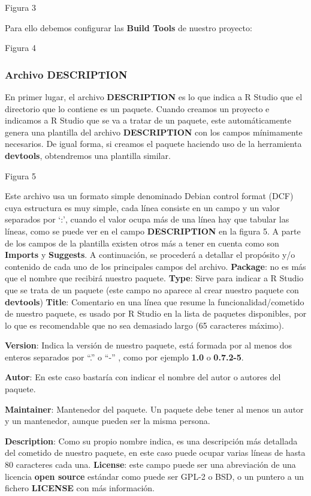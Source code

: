 Figura 3

Para ello debemos configurar las \textbf{Build Tools} de nuestro proyecto:

Figura 4

\subsubsection{Archivo DESCRIPTION}

En primer lugar, el archivo \textbf{DESCRIPTION} es lo que indica a R Studio que el directorio que lo
contiene es un paquete. Cuando creamos un proyecto e indicamos a R Studio que se va a
tratar de un paquete, este autom\'aticamente genera una plantilla del archivo \textbf{DESCRIPTION}
con los campos m\'inimamente necesarios. De igual forma, si creamos el paquete haciendo uso de la herramienta \textbf{devtools}, obtendremos
una plantilla similar.

Figura 5

Este archivo usa un formato simple denominado Debian control format (DCF) cuya estructura
es muy simple, cada l\'inea consiste en un campo y un valor separados por \enquote*{:}, cuando el valor
ocupa m\'as de una l\'inea hay que tabular las l\'ineas, como se puede ver en el campo
\textbf{DESCRIPTION} en la figura 5.
A parte de los campos de la plantilla existen otros m\'as a tener en cuenta como son \textbf{Imports}
y \textbf{Suggests}. A continuaci\'on, se proceder\'a a detallar el prop\'osito y/o contenido de cada uno
de los principales campos del archivo.
\textbf{Package}: no es m\'as que el nombre que recibir\'a nuestro paquete.
\textbf{Type}: Sirve para indicar a R Studio que se trata de un paquete (este campo no aparece al
crear nuestro paquete con \textbf{devtools})
\textbf{Title}: Comentario en una l\'inea que resume la funcionalidad/cometido de nuestro paquete, es
usado por R Studio en la lista de paquetes disponibles, por lo que es recomendable que no sea demasiado largo (65 caracteres m\'aximo).

\textbf{Version}: Indica la versi\'on de nuestro paquete, est\'a formada por al menos dos enteros
separados por “.” o “-” , como por ejemplo \textbf{1.0} o \textbf{0.7.2-5}. 

\textbf{Autor}: En este caso bastar\'ia con indicar el nombre del autor o autores del paquete.

\textbf{Maintainer}: Mantenedor del paquete.
Un paquete debe tener al menos un autor y un mantenedor, aunque pueden ser la misma
persona.

\textbf{Description}: Como su propio nombre indica, es una descripci\'on m\'as detallada del cometido
de nuestro paquete, en este caso puede ocupar varias l\'ineas de hasta 80 caracteres cada
una.
\textbf{License}: este campo puede ser una abreviaci\'on de una licencia \textbf{open source} est\'andar como
puede ser GPL-2 o BSD, o un puntero a un fichero \textbf{LICENSE} con m\'as informaci\'on.


